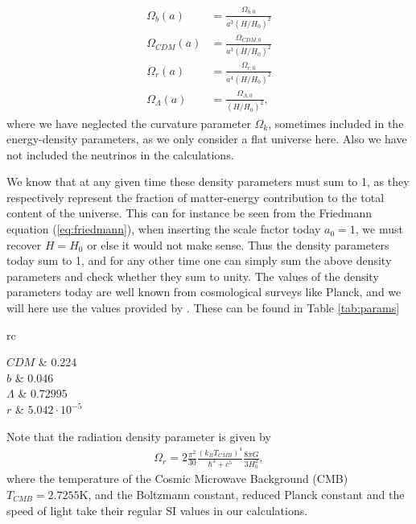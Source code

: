 \documentclass[twocolumn]{aastex62}
\begin{document}
\begin{align}
    \Omega_b(a) &= \frac{\Omega_{b,0}}{a^3 (H/H_0)^2}\\
    \Omega_{CDM}(a) &= \frac{\Omega_{CDM,0}}{a^3 (H/H_0)^2}\\
    \Omega_r(a) &= \frac{\Omega_{r,0}}{a^4 (H/H_0)^2}\\
    \Omega_\Lambda(a) &= \frac{\Omega_{\Lambda,0}}{(H/H_0)^2},
\end{align}
where we have neglected the curvature parameter $\Omega_k$, sometimes included in
the energy-density parameters, as we only consider a flat universe here. Also we
have not included the neutrinos in the calculations. 

We know that at any given time these density parameters must sum to 1, as they
respectively represent the fraction of matter-energy contribution to the total
content of the universe. This can for instance be seen from the Friedmann
equation (\ref{eq:friedmann}), when inserting the scale factor today $a_0 = 1$,
we must recover $H = H_0$ or else it would not make sense. Thus the density
parameters today sum to 1, and for any other time one can simply sum the above
density parameters and check whether they sum to unity.
The values of the density parameters today are well known from cosmological
surveys like Planck, and we will here use the values provided by \cite{callin:2006}. These can be found in Table \ref{tab:params}

\begin{deluxetable}{rc}
	
	\startdata
	$CDM$  &  0.224  \\
	$b$ & $0.046$  \\
	$\Lambda$ & $0.72995$   \\
	$r$ & $5.042\cdot 10^{-5}$  
	\enddata
\end{deluxetable}

Note that the radiation density parameter is given by 
\begin{align}
    \Omega_r = 2\frac{\pi^2}{30} \frac{(k_B T_{CMB})^4}{\hbar^3 + c^5}\frac{8\pi G}{3H_0^2},
\end{align}
where the temperature of the Cosmic Microwave Background (CMB) $T_{CMB} =
2.7255\mathrm{K}$, and the Boltzmann constant, reduced Planck constant and the speed of
light take their regular SI values in our calculations.
\end{document}
